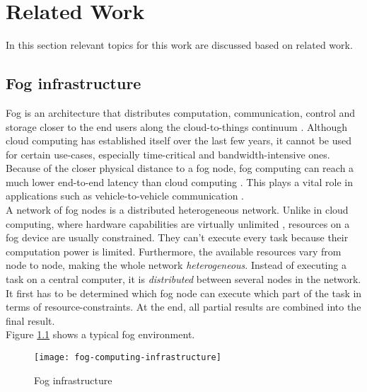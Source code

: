 \chapter{Related Work\label{cha:relwork}}
In this section relevant topics for this work are discussed based on related work.

\section{Fog infrastructure}
Fog is an architecture that distributes computation, communication, control and storage closer to the end users along the cloud-to-things continuum \cite{fog-research-opportunities}. Although cloud computing has established itself over the last few years, it cannot be used for certain use-cases, especially time-critical and bandwidth-intensive ones. Because of the closer physical distance to a fog node, fog computing can reach a much lower end-to-end latency than cloud computing \cite{mobility-aware-scheduling}\cite{novel-load-balancing}. This plays a vital role in applications such as vehicle-to-vehicle communication \cite{novel-load-balancing}.\\

A network of fog nodes is a distributed heterogeneous network. Unlike in cloud computing, where hardware capabilities are virtually unlimited \cite{fogtorch}, resources on a fog device are usually constrained. They can’t execute every task because their computation power is limited. Furthermore, the available resources vary from node to node, making the whole network \textit{heterogeneous}. Instead of executing a task on a central computer, it is \textit{distributed} between several nodes in the network. It first has to be determined which fog node can execute which part of the task in terms of resource-constraints. At the end, all partial results are combined into the final result.\\

Figure \ref{fig:foginfrastructure} shows a typical fog environment.

\begin{figure}
    \centering
    \texttt{[image: fog-computing-infrastructure]}
    \caption{Fog infrastructure}
    \label{fig:foginfrastructure}
\end{figure}

